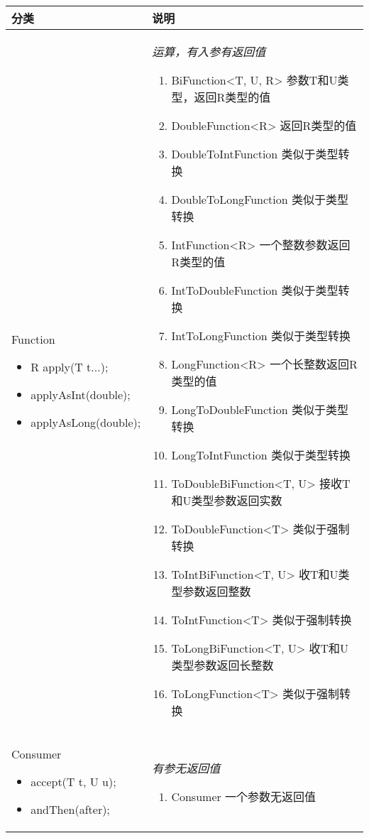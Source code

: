 \begin{longtable}{|p{4cm}|p{8.5cm}|}
	\hline
	分类&说明\\
	\hline
	Function
	\begin{itemize}
		\small
		\setlength{\itemindent}{-1.2em}
		\setlength{\itemsep}{0pt}
		\item R apply(T t...);
		\item applyAsInt(double);
		\item applyAsLong(double);
	\end{itemize} & \emph{运算，有入参有返回值}
	\begin{enumerate}
		\setlength{\itemsep}{0pt}
		\small
		\item BiFunction<T, U, R> 参数T和U类型，返回R类型的值
		\item DoubleFunction<R> 返回R类型的值
		\item DoubleToIntFunction 类似于类型转换
		\item DoubleToLongFunction 类似于类型转换
		\item IntFunction<R> 一个整数参数返回R类型的值
		\item IntToDoubleFunction 类似于类型转换
		\item IntToLongFunction 类似于类型转换
		\item LongFunction<R> 一个长整数返回R类型的值
		\item LongToDoubleFunction 类似于类型转换
		\item LongToIntFunction 类似于类型转换
		\item ToDoubleBiFunction<T, U> 接收T和U类型参数返回实数
		\item ToDoubleFunction<T> 类似于强制转换
		\item ToIntBiFunction<T, U> 收T和U类型参数返回整数
		\item ToIntFunction<T> 类似于强制转换
		\item ToLongBiFunction<T, U> 收T和U类型参数返回长整数
		\item ToLongFunction<T> 类似于强制转换
	\end{enumerate} \\
	\hline
	Consumer
	\begin{itemize}
		\small
		\setlength{\itemindent}{-1.2em}
		\setlength{\itemsep}{0pt}
		\item accept(T t, U u);
		\item andThen(after);
	\end{itemize} &
	\emph{有参无返回值}
	\begin{enumerate}
		\setlength{\itemsep}{0pt}
		\small
		\item Consumer 一个参数无返回值

\end{enumerate}
\end{longtable}
